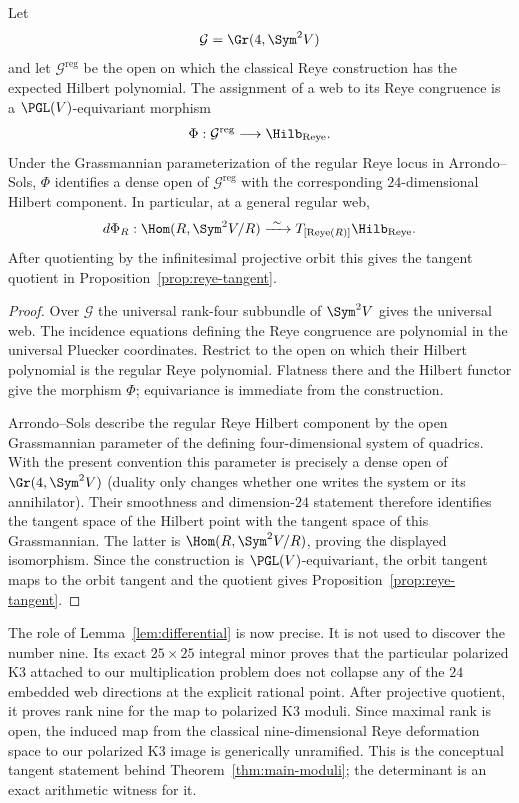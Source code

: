 \begin{proposition}
\label{prop:web-hilbert-bridge}
Let
\[
 \mathcal G=\Gr(4,\Sym^2V)
\]
and let \(\mathcal G^{\mathrm{reg}}\) be the open on which the classical
Reye construction has the expected Hilbert polynomial.  The assignment
of a web to its Reye congruence is a \(\PGL(V)\)-equivariant morphism
\[
 \Phi:\mathcal G^{\mathrm{reg}}
 \longrightarrow \Hilb_{\mathrm{Reye}}.
\]
Under the Grassmannian parameterization of the regular Reye locus in
Arrondo--Sols, \(\Phi\) identifies a dense open of
\(\mathcal G^{\mathrm{reg}}\) with the corresponding
\(24\)-dimensional Hilbert component.  In particular, at a general
regular web,
\[
 d\Phi_R:
 \Hom(R,\Sym^2V/R)
 \xrightarrow{\ \sim\ }
 T_{[\operatorname{Reye}(R)]}\Hilb_{\mathrm{Reye}}.
\]
After quotienting by the infinitesimal projective orbit this gives
the tangent quotient in Proposition~\ref{prop:reye-tangent}.
\end{proposition}

\begin{proof}
Over \(\mathcal G\) the universal rank-four subbundle of
\(\Sym^2V\) gives the universal web.  The incidence equations defining
the Reye congruence are polynomial in the universal Pluecker
coordinates.  Restrict to the open on which their Hilbert polynomial
is the regular Reye polynomial.  Flatness there and the Hilbert
functor give the morphism \(\Phi\); equivariance is immediate from
the construction.

Arrondo--Sols describe the regular Reye Hilbert component by the open
Grassmannian parameter of the defining four-dimensional system of
quadrics.  With the present convention this parameter is precisely a
dense open of \(\Gr(4,\Sym^2V)\) (duality only changes whether one
writes the system or its annihilator).  Their smoothness and
dimension-\(24\) statement therefore identifies the tangent space of
the Hilbert point with the tangent space of this Grassmannian.  The
latter is \(\Hom(R,\Sym^2V/R)\), proving the displayed isomorphism.
Since the construction is \(\PGL(V)\)-equivariant, the orbit tangent
maps to the orbit tangent and the quotient gives
Proposition~\ref{prop:reye-tangent}.
\end{proof}

The role of Lemma~\ref{lem:differential} is now precise.  It is not
used to discover the number nine.  Its exact $25\times25$ integral
minor proves that the particular polarized K3 attached to our
multiplication problem does not collapse any of the $24$ embedded
web directions at the explicit rational point.  After projective
quotient, it proves rank nine for the map to polarized K3 moduli.
Since maximal rank is open, the induced map from the classical
nine-dimensional Reye deformation space to our polarized K3 image is
generically unramified.  This is the conceptual tangent statement
behind Theorem~\ref{thm:main-moduli}; the determinant is an exact
arithmetic witness for it.

